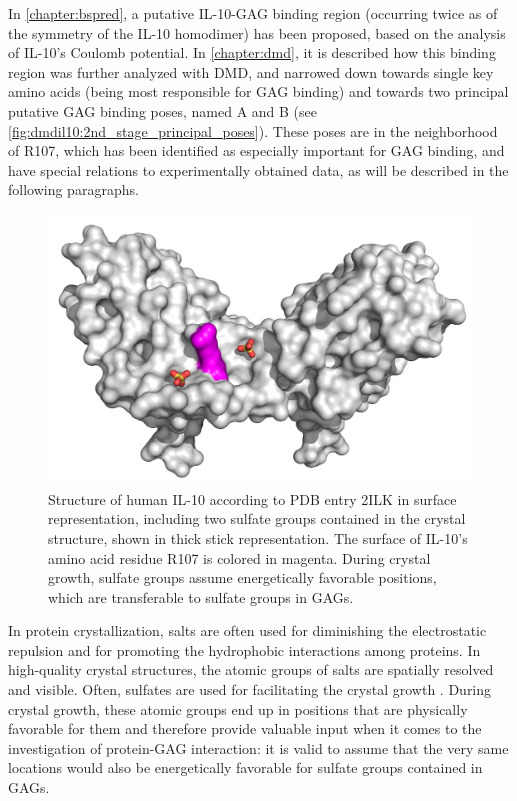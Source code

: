 In \cref{chapter:bspred}, a putative IL-10-GAG binding region (occurring twice
as of the symmetry of the IL-10 homodimer) has been proposed, based on the
analysis of IL-10's Coulomb potential. In \cref{chapter:dmd}, it is described
how this binding region was further analyzed with DMD, and narrowed down towards
single key amino acids (being most responsible for GAG binding) and towards two
principal putative GAG binding poses, named A and B (see
\cref{fig:dmdil10:2nd_stage_principal_poses}). These poses are in the
neighborhood of R107, which has been identified as especially important for GAG
binding, and have special relations to experimentally obtained data, as will be
described in the following paragraphs.

\begin{figure}
\centering
\includegraphics[width=1.0\textwidth]{gfx/together/il10sulfates_01.jpg}
\caption[]{
Structure of human IL-10 according to PDB entry 2ILK in surface representation,
including two sulfate groups contained in the crystal structure, shown in thick
stick representation. The surface of IL-10's amino acid residue R107 is colored
in magenta. During crystal growth, sulfate groups assume energetically favorable
positions, which are transferable to sulfate groups in GAGs.}
\label{fig:together:il10sulfates}
\end{figure}

In protein crystallization, salts are often used for diminishing the
electrostatic repulsion and for promoting the hydrophobic interactions among
proteins. In high-quality crystal structures, the atomic groups of salts are
spatially resolved and visible. Often, sulfates are used for facilitating the
crystal growth \cite{crystal_salts_2001}. During crystal growth, these atomic
groups end up in positions that are physically favorable for them and therefore
provide valuable input when it comes to the investigation of protein-GAG
interaction: it is valid to assume that the very same locations would also be
energetically favorable for sulfate groups contained in GAGs.

